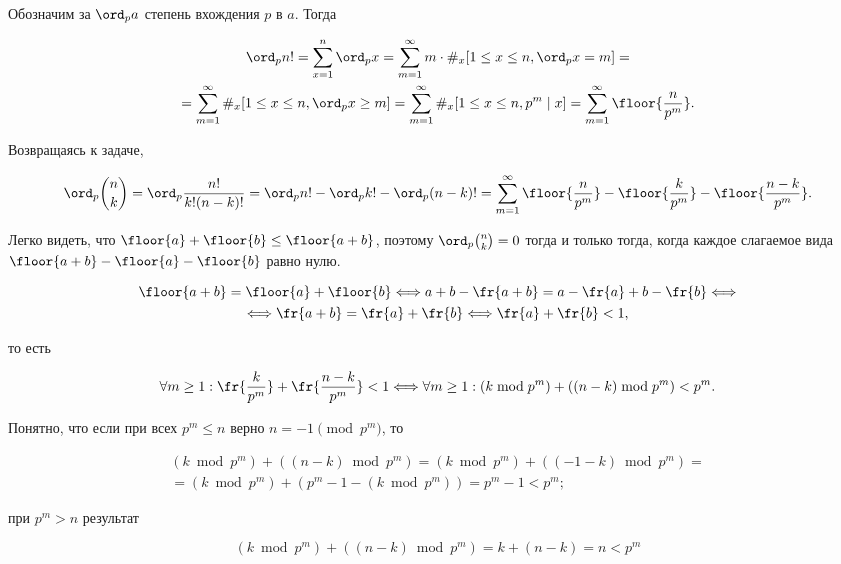 		Обозначим за $\ord_p a$ степень вхождения $p$ в $a$. Тогда

		\begin{multline*}
			\ord_p n! = \sum_{x=1}^n \ord_p x = \sum_{m=1}^\infty m \cdot \#_x [1 \le x \le n, \ord_p x = m] = \\
			= \sum_{m=1}^\infty \#_x [1 \le x \le n, \ord_p x \ge m] = \sum_{m=1}^\infty \#_x [1 \le x \le n, p^m \mid x] = \sum_{m=1}^\infty \floor{\frac{n}{p^m}}.
		\end{multline*}

		Возвращаясь к задаче,

		\begin{equation*}
			\ord_p \binom{n}{k} = \ord_p \frac{n!}{k! (n-k)!} = \ord_p n! - \ord_p k! - \ord_p (n-k)! = \sum_{m=1}^\infty \floor{\frac{n}{p^m}} - \floor{\frac{k}{p^m}} - \floor{\frac{n-k}{p^m}}.
		\end{equation*}

		Легко видеть, что $\floor{a} + \floor{b} \le \floor{a+b}$, поэтому $\ord_p \binom{n}{k} = 0$ тогда и только тогда, когда каждое слагаемое вида $\floor{a+b} - \floor{a} - \floor{b}$ равно нулю.

		\begin{multline*}
			\floor{a+b} = \floor{a} + \floor{b} \Longleftrightarrow a+b - \fr{a+b} = a - \fr{a} + b - \fr{b} \Longleftrightarrow \\
			\Longleftrightarrow \fr{a+b} = \fr{a} + \fr{b} \Longleftrightarrow \fr{a} + \fr{b} < 1,
		\end{multline*}

		то есть

		\begin{equation*}
			\forall m \ge 1: \fr{\frac{k}{p^m}} + \fr{\frac{n-k}{p^m}} < 1 \Longleftrightarrow \forall m \ge 1: (k \bmod p^m) + ((n-k) \bmod p^m) < p^m.
		\end{equation*}

		Понятно, что если при всех $p^m \le n$ верно $n = -1 \pmod{p^m}$, то

		\begin{multline*}
			(k \bmod p^m) + ((n-k) \bmod p^m) = (k \bmod p^m) + ((-1-k) \bmod p^m) = \\
			= (k \bmod p^m) + (p^m - 1 - (k \bmod p^m)) = p^m - 1 < p^m;
		\end{multline*}

		при $p^m > n$ результат

		\begin{equation*}
			(k \bmod p^m) + ((n-k) \bmod p^m) = k + (n - k) = n < p^m
		\end{equation*}

